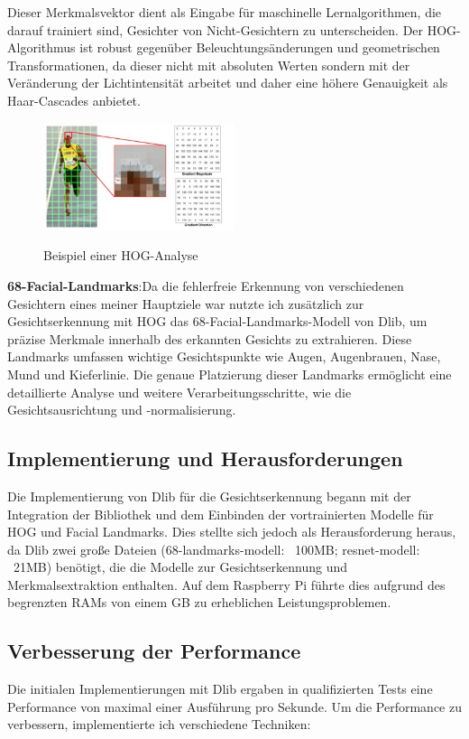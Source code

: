 Dieser Merkmalsvektor dient als Eingabe für maschinelle Lernalgorithmen, die darauf trainiert sind, Gesichter von Nicht-Gesichtern zu unterscheiden. Der HOG-Algorithmus ist robust gegenüber Beleuchtungsänderungen und geometrischen Transformationen, da dieser nicht mit absoluten Werten sondern mit der Veränderung der Lichtintensität arbeitet und  daher eine höhere Genauigkeit als Haar-Cascades anbietet\cite{hog_quelle}.

\begin{figure}[h!]
    \centering
    \includegraphics[width=0.5\textwidth]{pictures/hog.jpg}
    \caption{Beispiel einer HOG-Analyse}
    \label{fig:hoganalysis}
    \cite{hoganalysis}
\end{figure}

\textbf{68-Facial-Landmarks}:Da die fehlerfreie Erkennung von verschiedenen Gesichtern eines meiner Hauptziele war nutzte ich zusätzlich zur Gesichtserkennung mit HOG das 68-Facial-Landmarks-Modell von Dlib, um präzise Merkmale innerhalb des erkannten Gesichts zu extrahieren. Diese Landmarks umfassen wichtige Gesichtspunkte wie Augen, Augenbrauen, Nase, Mund und Kieferlinie. Die genaue Platzierung dieser Landmarks ermöglicht eine detaillierte Analyse und weitere Verarbeitungsschritte, wie die Gesichtsausrichtung und -normalisierung.

\subsection{Implementierung und Herausforderungen}
Die Implementierung von Dlib für die Gesichtserkennung begann mit der Integration der Bibliothek und dem Einbinden der vortrainierten Modelle für HOG und Facial Landmarks. Dies stellte sich jedoch als Herausforderung heraus, da Dlib zwei große Dateien (68-landmarks-modell: ~100MB; resnet-modell: ~21MB) benötigt, die die Modelle zur Gesichtserkennung und Merkmalsextraktion enthalten. Auf dem Raspberry Pi führte dies aufgrund des begrenzten RAMs von einem GB zu erheblichen Leistungsproblemen.

\subsection{Verbesserung der Performance}
Die initialen Implementierungen mit Dlib ergaben in qualifizierten Tests eine Performance von maximal einer Ausführung pro Sekunde. Um die Performance zu verbessern, implementierte ich verschiedene Techniken:

